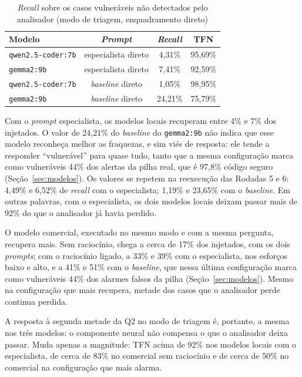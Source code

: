 \begin{table}[htpb]
    \centering
    \caption[\textit{Recall} sobre os casos não detectados pelo analisador]{\textit{Recall} sobre os casos vulneráveis não detectados pelo analisador (modo de triagem, enquadramento direto)}
    \label{tab:triagem}
    \renewcommand{\arraystretch}{1.4}
    \begin{tabular}{|l|c|c|c|}
        \hline
        \textbf{Modelo} & \textbf{\textit{Prompt}} & \textbf{\textit{Recall}} & \textbf{TFN} \\
        \hline
        \texttt{qwen2.5-coder:7b} & especialista direto & 4,31\% & 95,69\% \\
        \hline
        \texttt{gemma2:9b} & especialista direto & 7,41\% & 92,59\% \\
        \hline
        \texttt{qwen2.5-coder:7b} & \textit{baseline} direto & 1,05\% & 98,95\% \\
        \hline
        \texttt{gemma2:9b} & \textit{baseline} direto & 24,21\% & 75,79\% \\
        \hline
    \end{tabular}
    \fontepesquisa
\end{table}

Com o \textit{prompt} especialista, os modelos locais recuperam entre 4\% e 7\% dos injetados. O valor de 24,21\% do \textit{baseline} do \texttt{gemma2:9b} não indica que esse modelo reconheça melhor as fraquezas, e sim viés de resposta: ele tende a responder ``vulnerável'' para quase tudo, tanto que a mesma configuração marca como vulneráveis 44\% dos alertas da pilha real, que é 97,8\% código seguro (Seção~\ref{sec:modelos}). Os valores se repetem na reexecução das Rodadas 5 e 6: 4,49\% e 6,52\% de \textit{recall} com o especialista; 1,19\% e 23,65\% com o \textit{baseline}. Em outras palavras, com o especialista, os dois modelos locais deixam passar mais de 92\% do que o analisador já havia perdido.

O modelo comercial, executado no mesmo modo e com a mesma pergunta, recupera mais. Sem raciocínio, chega a cerca de 17\% dos injetados, com os dois \textit{prompts}; com o raciocínio ligado, a 33\% e 39\% com o especialista, nos esforços baixo e alto, e a 41\% e 51\% com o \textit{baseline}, que nessa última configuração marca como vulneráveis 44\% dos alarmes falsos da pilha (Seção~\ref{sec:modelos}). Mesmo na configuração que mais recupera, metade dos casos que o analisador perde continua perdida.

A resposta à segunda metade da Q2 no modo de triagem é, portanto, a mesma nos três modelos: o componente neural não compensa o que o analisador deixa passar. Muda apenas a magnitude: TFN acima de 92\% nos modelos locais com o especialista, de cerca de 83\% no comercial sem raciocínio e de cerca de 50\% no comercial na configuração que mais alarma.

